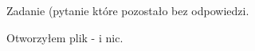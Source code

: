 \documentclass{article}
\begin{document}
Zadanie (pytanie które pozostało bez odpowiedzi.

Otworzyłem plik - i nic.
\end{document}

